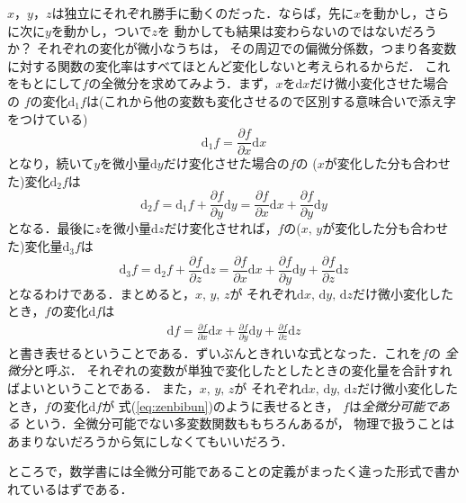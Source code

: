 $x$，$y$，$z$は独立にそれぞれ勝手に動くのだった．ならば，先に$x$を動かし，さらに次に$y$を動かし，ついで$z$を
動かしても結果は変わらないのではないだろうか？ それぞれの変化が微小なうちは，
その周辺での偏微分係数，つまり各変数に対する関数の変化率はすべてほとんど変化しないと考えられるからだ．
これをもとにして$f$の全微分を求めてみよう．まず，$x$を$\mathrm{d}x$だけ微小変化させた場合の
$f$の変化$\mathrm{d_1}f$は(これから他の変数も変化させるので区別する意味合いで添え字をつけている)
$$
\mathrm{d_1}f = \frac{\partial f}{\partial x} \mathrm{d}x
$$
となり，続いて$y$を微小量$\mathrm{d}y$だけ変化させた場合の$f$の
($x$が変化した分も合わせた)変化$\mathrm{d_2}f$は
$$
\mathrm{d_2}f = \mathrm{d_1}f + \frac{\partial f}{\partial y} \mathrm{d}y
= \frac{\partial f}{\partial x} \mathrm{d}x + \frac{\partial f}{\partial y} \mathrm{d}y
$$
となる．最後に$z$を微小量$\mathrm{d}z$だけ変化させれば，$f$の($x, \, y$が変化した分も合わせた)変化量$\mathrm{d_3}f$は
$$
\mathrm{d_3} f = \mathrm{d_2}f + \frac{\partial f}{\partial z}\mathrm{d}z = 
\frac{\partial f}{\partial x} \mathrm{d}x + \frac{\partial f}{\partial y} \mathrm{d}y 
+  \frac{\partial f}{\partial z}\mathrm{d}z
$$
となるわけである．まとめると，$x, \, y, \, z$が
それぞれ$\mathrm{d}x, \, \mathrm{d}y, \, \mathrm{d}z$だけ微小変化したとき，$f$の変化$\mathrm{d}f$は
\begin{eqnarray}
\mathrm{d}f =
\frac{\partial f}{\partial x} \mathrm{d}x + \frac{\partial f}{\partial y} \mathrm{d}y 
+  \frac{\partial f}{\partial z}\mathrm{d}z
\label{eq:zenbibun}
\end{eqnarray}
と書き表せるということである．ずいぶんときれいな式となった．これを$f$の
\emph{全微分}と呼ぶ．
それぞれの変数が単独で変化したとしたときの変化量を合計すればよいということである．
また，$x, \, y, \, z$が
それぞれ$\mathrm{d}x, \, \mathrm{d}y, \, \mathrm{d}z$だけ微小変化したとき，$f$の変化$\mathrm{d}f$が
式(\ref{eq:zenbibun})のように表せるとき，
$f$は\emph{全微分可能である}
という．全微分可能でない多変数関数ももちろんあるが，
物理で扱うことはあまりないだろうから気にしなくてもいいだろう．

ところで，数学書には全微分可能であることの定義がまったく違った形式で書かれているはずである．

